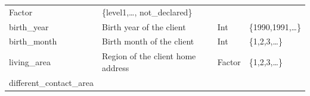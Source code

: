 \documentclass[
]{article}
\begin{document}
\begin{longtable}[]{@{}llll@{}}
\begin{minipage}[t]{0.11\columnwidth}
Factor\strut
\end{minipage} & \begin{minipage}[t]{0.19\columnwidth}\raggedright
\{level1,\ldots, not\_declared\}\strut
\end{minipage}\tabularnewline
\begin{minipage}[t]{0.30\columnwidth}\raggedright
birth\_year\strut
\end{minipage} & \begin{minipage}[t]{0.30\columnwidth}\raggedright
Birth year of the client\strut
\end{minipage} & \begin{minipage}[t]{0.11\columnwidth}\raggedright
Int\strut
\end{minipage} & \begin{minipage}[t]{0.19\columnwidth}\raggedright
\{1990,1991,\ldots\}\strut
\end{minipage}\tabularnewline
\begin{minipage}[t]{0.30\columnwidth}\raggedright
birth\_month\strut
\end{minipage} & \begin{minipage}[t]{0.30\columnwidth}\raggedright
Birth month of the client\strut
\end{minipage} & \begin{minipage}[t]{0.11\columnwidth}\raggedright
Int\strut
\end{minipage} & \begin{minipage}[t]{0.19\columnwidth}\raggedright
\{1,2,3,\ldots\}\strut
\end{minipage}\tabularnewline
\begin{minipage}[t]{0.30\columnwidth}\raggedright
living\_area\strut
\end{minipage} & \begin{minipage}[t]{0.30\columnwidth}\raggedright
Region of the client home address\strut
\end{minipage} & \begin{minipage}[t]{0.11\columnwidth}\raggedright
Factor\strut
\end{minipage} & \begin{minipage}[t]{0.19\columnwidth}\raggedright
\{1,2,3,\ldots\}\strut
\end{minipage}\tabularnewline
\begin{minipage}[t]{0.30\columnwidth}\raggedright
different\_contact\_area\strut
\end{minipage} & \begin{minipage}[t]{0.30\columnwidth}\raggedright

\end{minipage}
\end{longtable}
\end{document}

